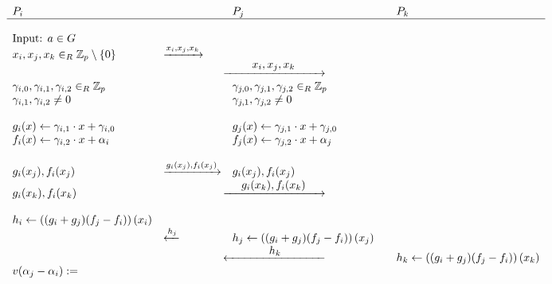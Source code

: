 \begin{figure}[H]
\tiny
$$
\begin{array}{lllll}
    P_i    &        & P_j    &        & P_k    \\
    \hline
    \\
    \text{Input: } a \in G 
            &        &        &        &        \\
    x_i, x_j, x_k \in_R \ZZ_p \setminus \{0\}
            & \xrightarrow{x_i,x_j,x_k}    &        &        &        \\
            & \multicolumn{3}{c}{\xrightarrow{\makebox[3cm]{$x_i,x_j,x_k$}}}  &        \\
    \gamma_{i,0}, \gamma_{i,1}, \gamma_{i,2} \in_R \ZZ_p
            &        & \gamma_{j,0}, \gamma_{j,1}, \gamma_{j,2} \in_R \ZZ_p
                             &        &        \\
    \gamma_{i,1}, \gamma_{i,2} \neq 0
            &        & \gamma_{j,1}, \gamma_{j,2} \neq 0
                             &        &        \\
    \\
    g_i(x) \leftarrow \gamma_{i,1} \cdot x + \gamma_{i,0}
            &        & g_j(x) \leftarrow \gamma_{j,1} \cdot x + \gamma_{j,0}
                             &        &        \\
    f_i(x) \leftarrow \gamma_{i,2} \cdot x + \alpha_i
            &        & f_j(x) \leftarrow \gamma_{j,2} \cdot x + \alpha_j
                             &        &        \\
    \\
    g_i(x_j), f_i(x_j)
            & \xrightarrow{g_i(x_j), f_i(x_j)}
                     & g_i(x_j), f_i(x_j)
                              &        &        \\
    g_i(x_k), f_i(x_k)
            & \multicolumn{3}{c}{\xrightarrow{\makebox[3cm]{$g_i(x_k), f_i(x_k)$}}} &        \\
    \\
        h_i \leftarrow \left((g_i+g_j)(f_j - f_i)\right)(x_i)
            &        &        &        &        \\
            & \xleftarrow{h_j}
                     & h_j \leftarrow \left((g_i+g_j)(f_j - f_i)\right)(x_j)
                              &        &        \\
            & \multicolumn{3}{c}{\xleftarrow{\makebox[3cm]{$h_k$}}}
                                       & h_k \leftarrow \left((g_i+g_j)(f_j - f_i)\right)(x_k) \\
    v(\alpha_j - \alpha_i) := 

\end{array}$$
\end{figure}
